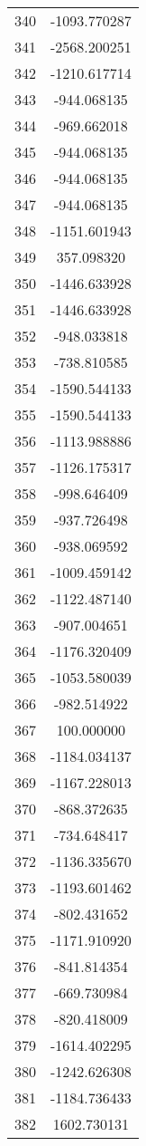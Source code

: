 \documentclass[12pt]{article}
\begin{document}
\begin{longtable}{@{}cc@{}}
340 & -1093.770287 \\
341 & -2568.200251 \\
342 & -1210.617714 \\
343 & -944.068135 \\
344 & -969.662018 \\
345 & -944.068135 \\
346 & -944.068135 \\
347 & -944.068135 \\
348 & -1151.601943 \\
349 & 357.098320 \\
350 & -1446.633928 \\
351 & -1446.633928 \\
352 & -948.033818 \\
353 & -738.810585 \\
354 & -1590.544133 \\
355 & -1590.544133 \\
356 & -1113.988886 \\
357 & -1126.175317 \\
358 & -998.646409 \\
359 & -937.726498 \\
360 & -938.069592 \\
361 & -1009.459142 \\
362 & -1122.487140 \\
363 & -907.004651 \\
364 & -1176.320409 \\
365 & -1053.580039 \\
366 & -982.514922 \\
367 & 100.000000 \\
368 & -1184.034137 \\
369 & -1167.228013 \\
370 & -868.372635 \\
371 & -734.648417 \\
372 & -1136.335670 \\
373 & -1193.601462 \\
374 & -802.431652 \\
375 & -1171.910920 \\
376 & -841.814354 \\
377 & -669.730984 \\
378 & -820.418009 \\
379 & -1614.402295 \\
380 & -1242.626308 \\
381 & -1184.736433 \\
382 & 1602.730131 \\

\end{longtable}
\end{document}
